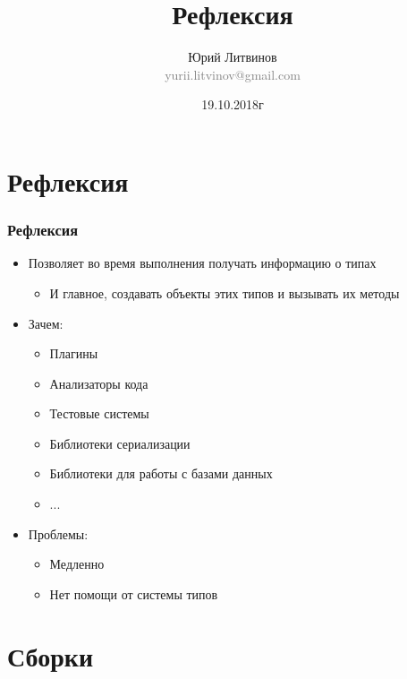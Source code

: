 \documentclass[xetex,mathserif,serif]{beamer}
\title{Рефлексия}
\author[Юрий Литвинов]{Юрий Литвинов\\\small{\textcolor{gray}{yurii.litvinov@gmail.com}}}
\date{19.10.2018г}
\begin{document}
	\frame{\titlepage}

	\section{Рефлексия}

	\begin{frame}
		\frametitle{Рефлексия}
		\begin{itemize}
			\item Позволяет во время выполнения получать информацию о типах
			\begin{itemize}
				\item И главное, создавать объекты этих типов и вызывать их методы
			\end{itemize}
			\item Зачем:
			\begin{itemize}
				\item Плагины
				\item Анализаторы кода
				\item Тестовые системы
				\item Библиотеки сериализации
				\item Библиотеки для работы с базами данных
				\item ...
			\end{itemize}
			\item Проблемы:
			\begin{itemize}
				\item Медленно
				\item Нет помощи от системы типов
			\end{itemize}
		\end{itemize}
	\end{frame}

	\section{Сборки}
\end{document}
